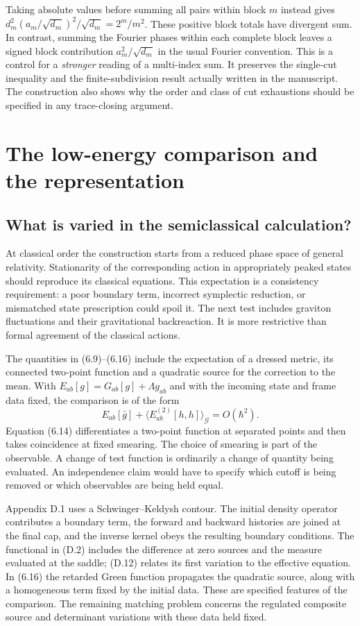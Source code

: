 \documentclass[11pt]{article}
\newcommand{\parttitle}[2]{\section{#1}}
\begin{document}
Taking absolute values before summing all pairs within block $m$ instead gives $d_m^2(a_m/\sqrt{d_m})^2/\sqrt{d_m}=2^m/m^2$. These positive block totals have divergent sum. In contrast, summing the Fourier phases within each complete block leaves a signed block contribution $a_m^2/\sqrt{d_m}$ in the usual Fourier convention. This is a control for a \emph{stronger} reading of a multi-index sum. It preserves the single-cut inequality and the finite-subdivision result actually written in the manuscript. The construction also shows why the order and class of cut exhaustions should be specified in any trace-closing argument.

\parttitle{The low-energy comparison and the representation}{Low energy and representation}
\subsection{What is varied in the semiclassical calculation?}
At classical order the construction starts from a reduced phase space of general relativity. Stationarity of the corresponding action in appropriately peaked states should reproduce its classical equations. This expectation is a consistency requirement: a poor boundary term, incorrect symplectic reduction, or mismatched state prescription could spoil it. The next test includes graviton fluctuations and their gravitational backreaction. It is more restrictive than formal agreement of the classical actions.

The quantities in (6.9)--(6.16) include the expectation of a dressed metric, its connected two-point function and a quadratic source for the correction to the mean. With $E_{ab}[g]=G_{ab}[g]+\Lambda g_{ab}$ and with the incoming state and frame data fixed, the comparison is of the form
\[
 E_{ab}[\bar g]+\langle E^{(2)}_{ab}[h,h]\rangle_{\mathcal G}
       =O(\hbar^2).
\]
Equation (6.14) differentiates a two-point function at separated points and then takes coincidence at fixed smearing. The choice of smearing is part of the observable. A change of test function is ordinarily a change of quantity being evaluated. An independence claim would have to specify which cutoff is being removed or which observables are being held equal.

Appendix D.1 uses a Schwinger--Keldysh contour. The initial density operator contributes a boundary term, the forward and backward histories are joined at the final cap, and the inverse kernel obeys the resulting boundary conditions. The functional in (D.2) includes the difference at zero sources and the measure evaluated at the saddle; (D.12) relates its first variation to the effective equation. In (6.16) the retarded Green function propagates the quadratic source, along with a homogeneous term fixed by the initial data. These are specified features of the comparison. The remaining matching problem concerns the regulated composite source and determinant variations with these data held fixed.
\end{document}
